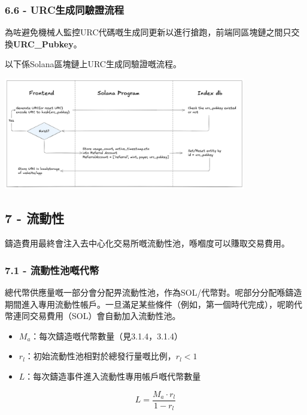 \documentclass[
]{article}
\providecommand{\tightlist}{%
  \setlength{\itemsep}{0pt}\setlength{\parskip}{0pt}}
\begin{document}
\subsubsection{6.6 -
URC生成同驗證流程}\label{urcux751fux6210ux540cux9a57ux8b49ux6d41ux7a0b}

為咗避免機械人監控URC代碼嘅生成同更新以進行搶跑，前端同區塊鏈之間只交換\textbf{URC\_Pubkey}。

以下係Solana區塊鏈上URC生成同驗證嘅流程。

\includegraphics[width=400px]{urc_workflow}

\subsection{7 - 流動性}\label{ux6d41ux52d5ux6027}

鑄造費用最終會注入去中心化交易所嘅流動性池，喺嗰度可以賺取交易費用。

\subsubsection{7.1 -
流動性池嘅代幣}\label{ux6d41ux52d5ux6027ux6c60ux5605ux4ee3ux5e63}

總代幣供應量嘅一部分會分配畀流動性池，作為SOL/代幣對。呢部分分配喺鑄造期間進入專用流動性帳戶。一旦滿足某些條件（例如，第一個時代完成），呢啲代幣連同交易費用（SOL）會自動加入流動性池。

\begin{itemize}
\tightlist
\item
  \(M_a\)：每次鑄造嘅代幣數量（見3.1.4，3.1.4）
\item
  \(r_l\)：初始流動性池相對於總發行量嘅比例，\(r_l < 1\)
\item
  \(L\)：每次鑄造事件進入流動性專用帳戶嘅代幣數量
\end{itemize}

\begin{equation}
L = \frac{M_a \cdot r_l}{1 - r_l}
\end{equation}
\end{document}

